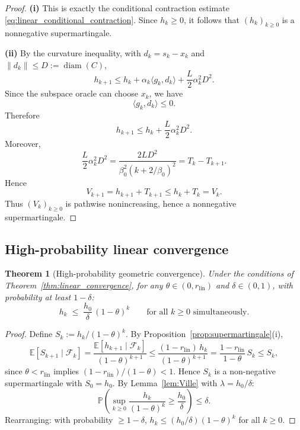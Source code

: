 \documentclass{article}
\DeclareMathOperator{\diam}{diam}
\newtheorem{theorem}{Theorem}
\begin{document}
\begin{proof}
\textbf{(i)}
This is exactly the conditional contraction estimate
\eqref{eq:linear_conditional_contraction}. Since \(h_k\ge0\), it follows that
\((h_k)_{k\ge0}\) is a nonnegative supermartingale.

\textbf{(ii)}
By the curvature inequality, with \(d_k=s_k-x_k\) and
\(\|d_k\|\le D:=\diam(C)\),
\[
h_{k+1}
\le
h_k+\alpha_k\langle g_k,d_k\rangle
+\frac{L}{2}\alpha_k^2D^2.
\]
Since the subspace oracle can choose \(x_k\), we have
\[
\langle g_k,d_k\rangle\le0.
\]
Therefore
\[
h_{k+1}
\le
h_k+\frac{L}{2}\alpha_k^2D^2.
\]
Moreover,
\[
\frac{L}{2}\alpha_k^2D^2
=
\frac{2LD^2}{\beta_0^2(k+2/\beta_0)^2}
=
T_k-T_{k+1}.
\]
Hence
\[
V_{k+1}
=
h_{k+1}+T_{k+1}
\le
h_k+T_k
=
V_k.
\]
Thus \((V_k)_{k\ge0}\) is pathwise nonincreasing, hence a nonnegative
supermartingale.
\end{proof}

\subsection{High-probability linear convergence}

\begin{theorem}[High-probability geometric convergence]
\label{thm:hp_linear_app}
Under the conditions of Theorem~\ref{thm:linear_convergence},
for any $\theta\in(0,r_{\mathrm{lin}})$ and $\delta\in(0,1)$, with probability
at least $1-\delta$:
\begin{equation}
h_k\;\le\;\frac{h_0}{\delta}\,(1-\theta)^k
\qquad\text{for all }k\ge 0\text{ simultaneously.}
\label{eq:hp_linear_app}
\end{equation}
\end{theorem}

\begin{proof}
Define $S_k:=h_k/(1-\theta)^k$.
By Proposition~\ref{prop:supermartingale}(i),
\[
\mathbb E[S_{k+1}\mid\mathcal F_k]
=\frac{\mathbb E[h_{k+1}\mid\mathcal F_k]}{(1-\theta)^{k+1}}
\le\frac{(1-r_{\mathrm{lin}})\,h_k}{(1-\theta)^{k+1}}
=\frac{1-r_{\mathrm{lin}}}{1-\theta}\,S_k
\le S_k,
\]
since $\theta<r_{\mathrm{lin}}$ implies $(1-r_{\mathrm{lin}})/(1-\theta)<1$.
Hence $S_k$ is a non-negative supermartingale with $S_0=h_0$.
By Lemma~\ref{lem:Ville} with $\lambda=h_0/\delta$:
\[
\mathbb P\!\left(\sup_{k\ge 0}\frac{h_k}{(1-\theta)^k}
\ge\frac{h_0}{\delta}\right)\le\delta.
\]
Rearranging: with probability $\ge 1-\delta$,
$h_k\le (h_0/\delta)(1-\theta)^k$ for all $k\ge 0$.
\end{proof}
\end{document}
